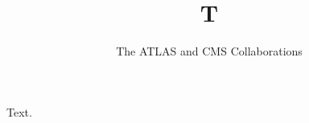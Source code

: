 \documentclass{svjour3}
\begin{document}
\title{T}
\author{The ATLAS and CMS Collaborations}
\date{}
\maketitle
Text.
\end{document}
